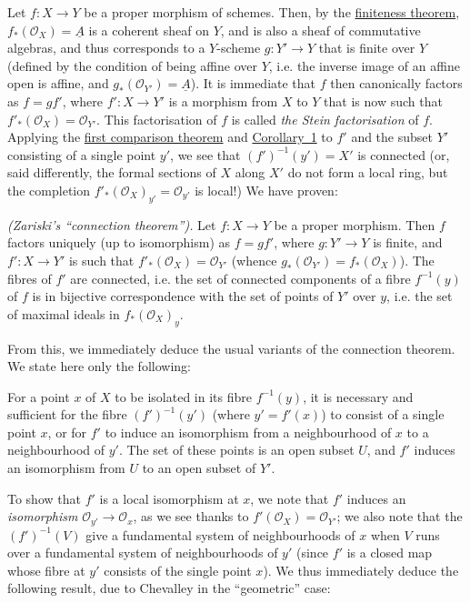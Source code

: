 \documentclass{article}
\theoremstyle{plain}
\newenvironment{theorem}[1]
  {\renewcommand\theinnercustomtheorem{#1}\innercustomtheorem}
  {\endinnercustomtheorem}
\newenvironment{corollary}[1]
  {\renewcommand\theinnercustomcorollary{#1}\innercustomcorollary}
  {\endinnercustomcorollary}
\theoremstyle{definition}
\newcommand{\sh}{\mathscr}
\newcommand{\oldpage}[1]{\marginpar{\footnotesize$\Big\vert$ \textit{p.~#1}}}
\begin{document}
Let $f\colon X\to Y$ be a proper morphism of schemes.
Then, by the \hyperref[theorem1]{finiteness theorem}, $f_*(\sh{O}_X)=\underline{A}$ is a coherent sheaf on $Y$, and is also a sheaf of commutative algebras, and thus corresponds to a $Y$-scheme $g\colon Y'\to Y$ that is finite over $Y$ (defined by the condition of being affine over $Y$, i.e. the inverse image of an affine open is affine, and $g_*(\sh{O}_{Y'})=\underline{A}$).
It is immediate that $f$ then canonically factors as $f=gf'$, where $f'\colon X\to Y'$ is a morphism from $X$ to $Y$ that is now such that $f'_*(\sh{O}_X)=\sh{O}_{Y'}$.
This factorisation of $f$ is called \emph{the Stein factorisation} of $f$.
Applying the \hyperref[theorem2]{first comparison theorem} and \hyperref[theorem2corollary1]{Corollary~1} to $f'$ and the subset $Y'$ consisting of a single point $y'$, we see that $(f')^{-1}(y')=X'$ is connected (or, said differently, the formal sections of $X$ along $X'$ do not form a local ring, but the completion $f'_*(\sh{O}_X)_{y'}=\sh{O}_{y'}$ is local!)
We have proven:

\begin{theorem}{5}
\label{theorem5}
  \emph{(Zariski's ``connection theorem'').}
  Let $f\colon X\to Y$ be a proper morphism.
  Then $f$ factors uniquely (up to isomorphism) as $f=gf'$, where $g\colon Y'\to Y$ is finite, and $f'\colon X\to Y'$ is such that $f'_*(\sh{O}_X)=\sh{O}_{Y'}$ (whence $g_*(\sh{O}_{Y'})=f_*(\sh{O}_X)$).
  The fibres of $f'$ are connected,
\oldpage{182-06}
  i.e. the set of connected components of a fibre $f^{-1}(y)$ of $f$ is in bijective correspondence with the set of points of $Y'$ over $y$, i.e. the set of maximal ideals in $f_*(\sh{O}_X)_y$.
\end{theorem}

From this, we immediately deduce the usual variants of the connection theorem.
We state here only the following:

\begin{corollary}{1}
\label{theorem5corollary1}
  For a point $x$ of $X$ to be isolated in its fibre $f^{-1}(y)$, it is necessary and sufficient for the fibre $(f')^{-1}(y')$ (where $y'=f'(x)$) to consist of a single point $x$, or for $f'$ to induce an isomorphism from a neighbourhood of $x$ to a neighbourhood of $y'$.
  The set of these points is an open subset $U$, and $f'$ induces an isomorphism from $U$ to an open subset of $Y'$.
\end{corollary}

To show that $f'$ is a local isomorphism at $x$, we note that $f'$ induces an \emph{isomorphism} $\sh{O}_{y'}\to\sh{O}_x$, as we see thanks to $f'(\sh{O}_X)=\sh{O}_{Y'}$;
we also note that the $(f')^{-1}(V)$ give a fundamental system of neighbourhoods of $x$ when $V$ runs over a fundamental system of neighbourhoods of $y'$ (since $f'$ is a closed map whose fibre at $y'$ consists of the single point $x$).
We thus immediately deduce the following result, due to Chevalley in the ``geometric'' case:
\end{document}

